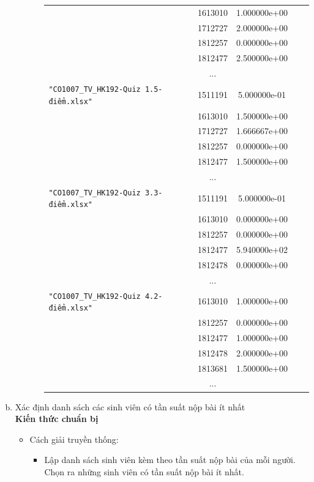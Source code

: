 \documentclass[a4paper]{article}
\theoremstyle{definition}
\begin{document}
\begin{enumerate}[a)]
\begin{itemize}
\begin{itemize}
\begin{center}
\begin{tabular}{l c c c c}
                     & 1613010 & 1.000000e+00\\
                     & 1712727 & 2.000000e+00\\
                     & 1812257 & 0.000000e+00\\
                     & 1812477 & 2.500000e+00\\
                     & ...\\
                     \texttt{"CO1007\_TV\_HK192-Quiz 1.5-điểm.xlsx"} & 1511191 & 5.000000e-01 \\ & 1613010 & 1.500000e+00 \\ & 1712727 & 1.666667e+00 \\ & 1812257 & 0.000000e+00 \\ & 1812477 & 1.500000e+00\\
                     & ...\\
                     \texttt{"CO1007\_TV\_HK192-Quiz 3.3-điểm.xlsx"} & 1511191 & 5.000000e-01 \\ & 1613010 & 0.000000e+00 \\ & 1812257 & 0.000000e+00 \\ & 1812477 & 5.940000e+02 \\ & 1812478 & 0.000000e+00\\
                     & ...\\
                     \texttt{"CO1007\_TV\_HK192-Quiz 4.2-điểm.xlsx"} & 1613010 & 1.000000e+00 \\ & 1812257 & 0.000000e+00 \\ & 1812477 & 1.000000e+00 \\ & 1812478 & 2.000000e+00 \\ & 1813681 & 1.500000e+00\\
                     & ...
                \end{tabular}
            \end{center}
        \end{itemize}
    \end{itemize}
    \bf\item {Xác định danh sách các sinh viên có tần suất nộp bài ít nhất}\\[6pt]
    \bf Kiến thức chuẩn bị\normalfont
    \begin{itemize}
        \item Cách giải truyền thống:
        \begin{itemize}
            \item Lập danh sách sinh viên kèm theo tần suất nộp bài của mỗi người. Chọn ra những sinh viên có tần suất nộp bài ít nhất.

\end{itemize}
\end{itemize}
\end{enumerate}
\end{document}
